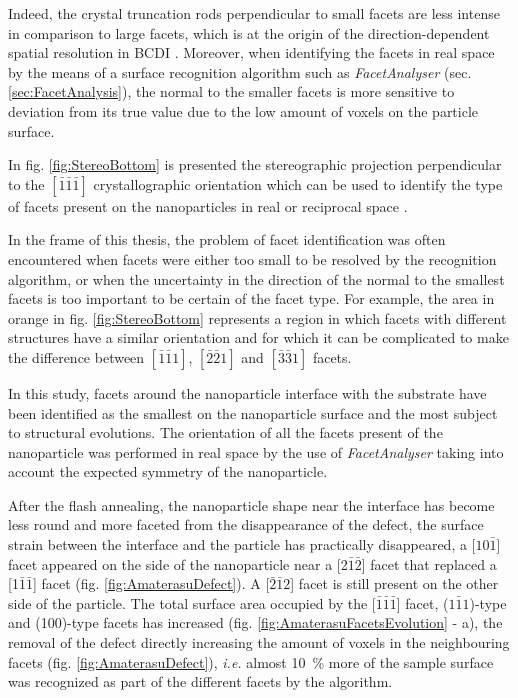 Indeed, the crystal truncation rods perpendicular to small facets are less intense in comparison to large facets, which is at the origin of the direction-dependent spatial resolution in BCDI \parencite{cherukara_anisotropic_2018}.
Moreover, when identifying the facets in real space by the means of a surface recognition algorithm such as \textit{FacetAnalyser} (sec. \ref{sec:FacetAnalysis}), the normal to the smaller facets is more sensitive to deviation from its true value due to the low amount of voxels on the particle surface.

In fig. \ref{fig:StereoBottom} is presented the stereographic projection perpendicular to the $[\bar{1}\bar{1}\bar{1}]$ crystallographic orientation which can be used to identify the type of facets present on the nanoparticles in real or reciprocal space \parencite{Richard2018}.

In the frame of this thesis, the problem of facet identification was often encountered when facets were either too small to be resolved by the recognition algorithm, or when the uncertainty in the direction of the normal to the smallest facets is too important to be certain of the facet type.
For example, the area in orange in fig. \ref{fig:StereoBottom} represents a region in which facets with different structures have a similar orientation and for which it can be complicated to make the difference between $[\bar{1}\bar{1}1]$, $[\bar{2}\bar{2}1]$ and $[\bar{3}\bar{3}1]$ facets.

In this study, facets around the nanoparticle interface with the substrate have been identified as the smallest on the nanoparticle surface and the most subject to structural evolutions.
The orientation of all the facets present of the nanoparticle was performed in real space by the use of \textit{FacetAnalyser} taking into account the expected symmetry of the nanoparticle.

After the flash annealing, the nanoparticle shape near the interface has become less round and more faceted from the disappearance of the defect, the surface strain between the interface and the particle has practically disappeared, a [$10\bar{1}$] facet appeared on the side of the nanoparticle near a [2$\bar{1}\bar{2}$] facet that replaced a [1$\bar{1}\bar{1}$] facet (fig. \ref{fig:AmaterasuDefect}).
A [$\bar{2}\bar{1}2$] facet is still present on the other side of the particle.
The total surface area occupied by the [$\bar{1}\bar{1}\bar{1}$] facet, ($1\bar{1}1$)-type and (100)-type facets has increased (fig. \ref{fig:AmaterasuFacetsEvolution} - a), the removal of the defect directly increasing the amount of voxels in the neighbouring facets (fig. \ref{fig:AmaterasuDefect}), \textit{i.e.} almost \qty{10}{\percent} more of the sample surface was recognized as part of the different facets by the algorithm.

